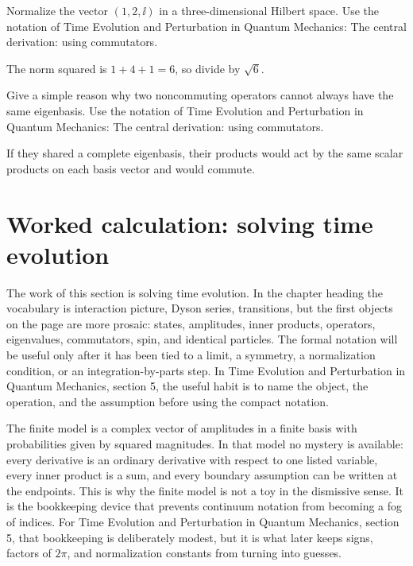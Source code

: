 \begin{exercise}
Normalize the vector \((1,2,\ii)\) in a three-dimensional Hilbert space.  Use the notation of Time Evolution and Perturbation in Quantum Mechanics: The central derivation: using commutators.
\begin{answer}
The norm squared is \(1+4+1=6\), so divide by \(\sqrt6\).
\end{answer}
\end{exercise}

\begin{exercise}
Give a simple reason why two noncommuting operators cannot always have the same eigenbasis.  Use the notation of Time Evolution and Perturbation in Quantum Mechanics: The central derivation: using commutators.
\begin{answer}
If they shared a complete eigenbasis, their products would act by the same scalar products on each basis vector and would commute.
\end{answer}
\end{exercise}



\section{Worked calculation: solving time evolution}

The work of this section is solving time evolution.  In the chapter heading the vocabulary is interaction picture, Dyson series, transitions, but the first objects on the page are more prosaic: states, amplitudes, inner products, operators, eigenvalues, commutators, spin, and identical particles.  The formal notation will be useful only after it has been tied to a limit, a symmetry, a normalization condition, or an integration-by-parts step.  In Time Evolution and Perturbation in Quantum Mechanics, section 5, the useful habit is to name the object, the operation, and the assumption before using the compact notation.

The finite model is a complex vector of amplitudes in a finite basis with probabilities given by squared magnitudes.  In that model no mystery is available: every derivative is an ordinary derivative with respect to one listed variable, every inner product is a sum, and every boundary assumption can be written at the endpoints.  This is why the finite model is not a toy in the dismissive sense.  It is the bookkeeping device that prevents continuum notation from becoming a fog of indices.  For Time Evolution and Perturbation in Quantum Mechanics, section 5, that bookkeeping is deliberately modest, but it is what later keeps signs, factors of \(2\pi\), and normalization constants from turning into guesses.

